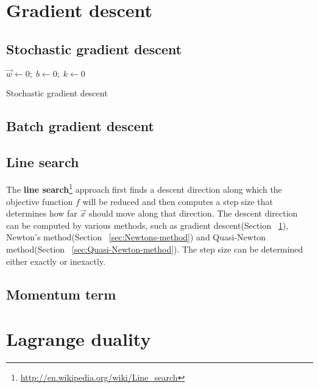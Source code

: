 \section{Gradient descent}
\label{sec:Gradient-descent}


\subsection{Stochastic gradient descent}

\begin{algorithm}[htbp]
	
    $\vec{w} \leftarrow 0;\; b \leftarrow 0;\; k \leftarrow 0$\;
\caption{Stochastic gradient descent}
\end{algorithm}


\subsection{Batch gradient descent}


\subsection{Line search}
The \textbf{line search}\footnote{\url{http://en.wikipedia.org/wiki/Line_search}} approach first finds a descent direction along which the objective function $f$ will be reduced and then computes a step size that determines how far $\vec{x}$ should move along that direction. The descent direction can be computed by various methods, such as gradient descent(Section ~\ref{sec:Gradient-descent}), Newton's method(Section ~\ref{sec:Newtons-method}) and Quasi-Newton method(Section ~\ref{sec:Quasi-Newton-method}). The step size can be determined either exactly or inexactly.


\subsection{Momentum term}


\section{Lagrange duality}



